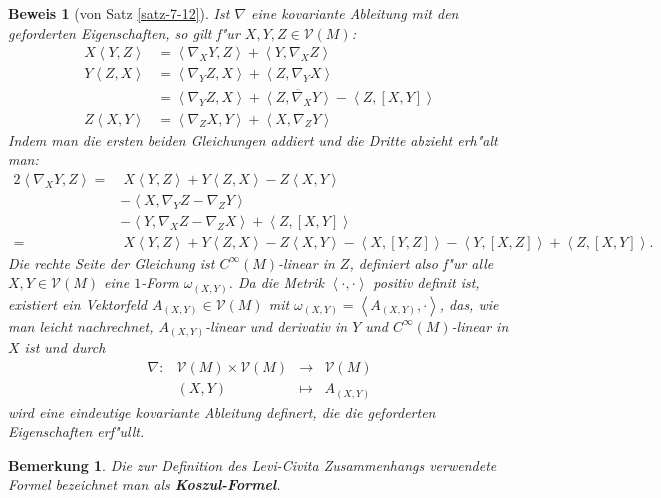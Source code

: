 \documentclass[paper=A4, twoside, chapterprefix=true, bibliography=totoc, headsepline]{scrbook}
\theoremstyle{plain}
\theoremstyle{nonumberplain}
\newtheorem{bem}{Bemerkung}
\newtheorem{bew}{Beweis}
\theoremstyle{empty}
\theoremstyle{break}
\newcommand{\CmIndex}[2][]{\ifthenelse{\isempty{#1}}{\index{#2}}{\index{#1}}#2}
\newcommand{\CmMark}[2][]{\textbf{\CmIndex[#1]{#2}}}
\begin{document}
\begin{bew}[von Satz \ref{satz-7-12}]
  Ist $\nabla$ eine kovariante Ableitung mit den geforderten Eigenschaften, so gilt f"ur $X,Y,Z \in \mathcal V(M)$:
  \begin{align*}
    X\left<Y,Z\right> & = \left<\nabla_XY,Z\right> + \left<Y,\nabla_XZ\right>\\
    Y\left<Z,X\right> & = \left<\nabla_YZ,X\right> + \left<Z,\nabla_YX\right>\\
    & = \left<\nabla_YZ,X\right> + \overline{\left<Z,\nabla_XY\right>} - \left<Z,[X,Y]\right>\\
    Z\left<X,Y\right> & = \left<\nabla_ZX,Y \right> + \left<X,\nabla_ZY\right>
  \end{align*}
  Indem man die ersten beiden Gleichungen addiert und die Dritte abzieht erh"alt man:
  \begin{align*}
    2\left<\nabla_XY,Z\right> = & \ X \left<Y,Z\right> + Y\left<Z,X\right> - Z\left<X,Y\right>\\
    & - \left<X,\nabla_YZ - \nabla_ZY\right> \\
    & - \left<Y,\nabla_XZ - \nabla_ZX\right> + \left<Z,[X,Y]\right>\\
    = & \ X\left<Y,Z\right> + Y\left<Z,X\right> - Z\left<X,Y\right> - \left<X,[Y,Z]\right> - \left<Y,[X,Z]\right> + \left<Z,[X,Y]\right>.
  \end{align*}
  Die rechte Seite der Gleichung ist $C^{\infty}(M)$-linear in $Z$, definiert also f"ur alle $X,Y \in \mathcal V(M)$ eine $1$-Form $\omega_{(X,Y)}$.
  Da die Metrik $\left<\cdot,\cdot\right>$ positiv definit ist, existiert ein Vektorfeld $A_{(X,Y)} \in \mathcal V(M)$ mit $\omega_{(X,Y)} = \left<A_{(X,Y)},\cdot\right>$, das, wie man leicht nachrechnet, $A_{(X,Y)}$-linear und derivativ in $Y$ und $C^{\infty}(M)$-linear in $X$ ist und durch
  \[\begin{array}{cccc}
    \nabla \colon & \mathcal V(M) \times \mathcal V(M) &\to& \mathcal V(M)\\
    &(X,Y) &\mapsto& A_{(X,Y)}
  \end{array}\]
  wird eine eindeutige kovariante Ableitung definert, die die geforderten Eigenschaften erf"ullt.
\end{bew}

\begin{bem}
  Die zur Definition des Levi-Civita Zusammenhangs verwendete Formel bezeichnet man als \CmMark{Koszul-Formel}.
\end{bem}
\end{document}
